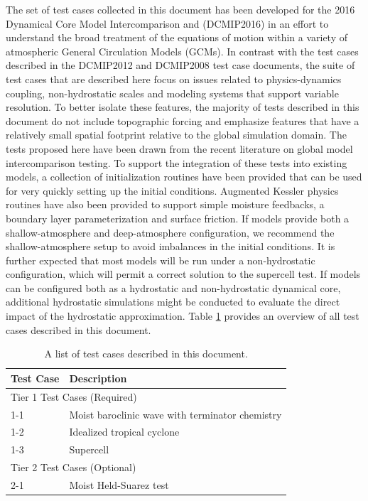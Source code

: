 \documentclass[times,doublespace]{fldauth}
\newcommand\T{\rule{0pt}{2.6ex}}
\newcommand\B{\rule[-1.2ex]{0pt}{0pt}}
\begin{document}
The set of test cases collected in this document has been developed for the 2016 Dynamical Core Model Intercomparison and (DCMIP2016) in an effort to understand the broad treatment of the equations of motion within a variety of atmospheric General Circulation Models (GCMs). In contrast with the test cases described in the DCMIP2012 and DCMIP2008 test case documents, the suite of test cases that are described here focus on issues related to physics-dynamics coupling, non-hydrostatic scales and modeling systems that support variable resolution.  To better isolate these features, the majority of tests described in this document do not include topographic forcing and emphasize features that have a relatively small spatial footprint relative to the global simulation domain.  The tests proposed here have been drawn from the recent literature on global model intercomparison testing.  To support the integration of these tests into existing models, a collection of initialization routines have been provided that can be used for very quickly setting up the initial conditions.  Augmented Kessler physics routines have also been provided to support simple moisture feedbacks, a boundary layer parameterization and surface friction.  If models provide both a shallow-atmosphere and deep-atmosphere configuration, we recommend the shallow-atmosphere setup to avoid imbalances in the initial conditions. It is further expected that most models will be run under a non-hydrostatic configuration, which will permit a correct solution to the supercell test.  If models can be configured both as a hydrostatic and non-hydrostatic dynamical core, additional hydrostatic simulations might be conducted to evaluate the direct impact of the hydrostatic approximation.  Table \ref{tab:TestCases} provides an overview of all test cases described in this document.

\begin{table}[h]

\caption{A list of test cases described in this document.} \label{tab:TestCases}
\begin{tabular*}{\textwidth}{@{\extracolsep{\fill}}ll}
\hline Test Case \T \B& Description \\
\hline \multicolumn{2}{l}{Tier 1 Test Cases (Required)} \T \B \\
\hline 
1-1 \T & Moist baroclinic wave with terminator chemistry \\
1-2 \T & Idealized tropical cyclone \\
1-3 \T & Supercell \\
\hline \multicolumn{2}{l}{Tier 2 Test Cases (Optional)} \T \B \\  \hline 
2-1 \T \B & Moist Held-Suarez test  \\ \hline
\hline 
\end{tabular*}

\end{table}
\end{document}
